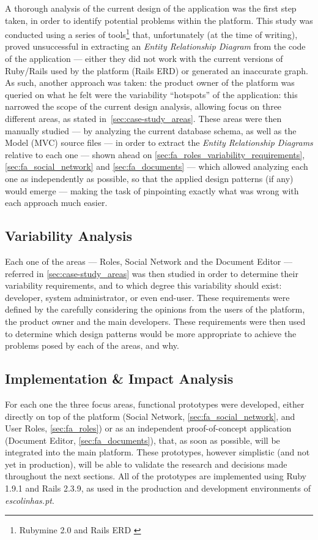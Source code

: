A thorough analysis of the current design of the application was the first step taken, in order to identify potential problems within the platform. This study was conducted using a series of tools\footnote{Rubymine 2.0 \cite{rubymine} and Rails ERD \cite{rails_erd}} that, unfortunately (at the time of writing), proved unsuccessful in extracting an \emph{Entity Relationship Diagram} from the code of the application --- either they did not work with the current versions of Ruby/Rails used by the platform (Rails ERD) or generated an inaccurate graph. As such, another approach was taken: the product owner of the platform was queried on what he felt were the variability ``hotspots'' of the application: this narrowed the scope of the current design analysis, allowing focus on three different areas, as stated in~\ref{sec:case-study_areas}. These areas were then manually studied --- by analyzing the current database schema, as well as the Model (MVC) source files --- in order to extract the \emph{Entity Relationship Diagrams} relative to each one --- shown ahead on \ref{sec:fa_roles_variability_requirements}, \ref{sec:fa_social_network} and \ref{sec:fa_documents} --- which allowed analyzing each one as independently as possible, so that the applied design patterns (if any) would emerge --- making the task of pinpointing exactly what was wrong with each approach much easier.

\subsection{Variability Analysis}\label{sec:variability_analysis}

Each one of the areas --- Roles, Social Network and the Document Editor --- referred in \ref{sec:case-study_areas} was then studied in order to determine their variability requirements, and to which degree this variability should exist: developer, system administrator, or even end-user. These requirements were defined by the carefully considering the opinions from the users of the platform, the product owner and the main developers. These requirements were then used to determine which design patterns would be more appropriate to achieve the problems posed by each of the areas, and why.

\subsection{Implementation \& Impact Analysis}

For each one the three focus areas, functional prototypes were developed, either directly on top of the platform (Social Network, \ref{sec:fa_social_network}, and User Roles, \ref{sec:fa_roles}) or as an independent proof-of-concept application (Document Editor, \ref{sec:fa_documents}), that, as soon as possible, will be integrated into the main platform. These prototypes, however simplistic (and not yet in production), will be able to validate the research and decisions made throughout the next sections. All of the prototypes are implemented using Ruby 1.9.1 and Rails 2.3.9, as used in the production and development environments of \emph{escolinhas.pt}.

